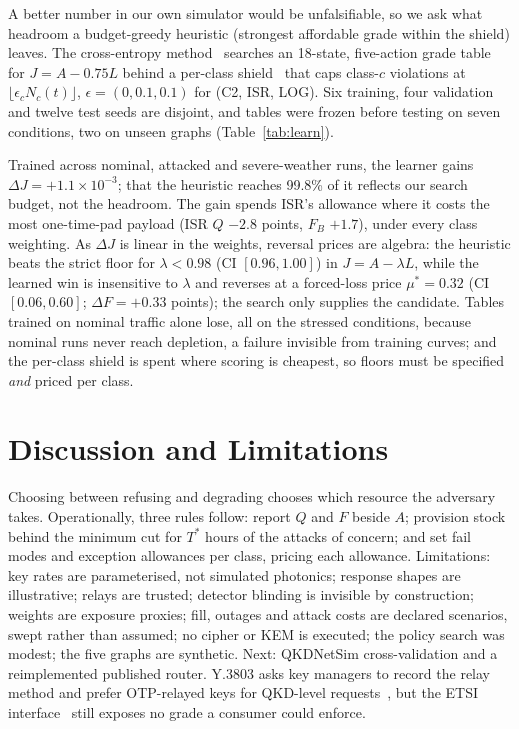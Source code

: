 \documentclass[conference,a4paper]{IEEEtran}
\begin{document}
A better number in our own simulator would be unfalsifiable, so we ask what headroom
a budget-greedy heuristic (strongest affordable grade within the shield) leaves. The
cross-entropy method~\cite{cem} searches an 18-state, five-action grade table for
$J=A-0.75L$ behind a per-class shield~\cite{shield} that caps class-$c$ violations at
$\lfloor\epsilon_cN_c(t)\rfloor$, $\epsilon=(0,0.1,0.1)$ for (C2, ISR, LOG). Six training, four validation and twelve test seeds are disjoint, and tables were frozen before testing
on seven conditions, two on unseen graphs (Table~\ref{tab:learn}).

Trained across nominal, attacked and severe-weather runs, the learner gains $\Delta J=+1.1\times10^{-3}$; that the heuristic reaches 99.8\% of it reflects our
search budget, not the headroom. The gain spends ISR's allowance where it costs the
most one-time-pad payload (ISR $Q$ $-2.8$ points, $F_B$ $+1.7$), under every class
weighting. As $\Delta J$ is linear in the weights, reversal prices are algebra: the
heuristic beats the strict floor for $\lambda<0.98$ (CI $[0.96,1.00]$) in
$J=A-\lambda L$, while the learned win is insensitive to $\lambda$ and reverses at a
forced-loss price $\mu^\ast=0.32$ (CI $[0.06,0.60]$; $\Delta F=+0.33$ points); the
search only supplies the candidate. Tables trained on nominal traffic alone lose, all
on the stressed conditions, because nominal runs never reach depletion, a failure
invisible from training curves; and the per-class shield is spent where scoring is
cheapest, so floors must be specified \emph{and} priced per class.

\section{Discussion and Limitations}
Choosing between refusing and degrading chooses which resource the adversary takes. Operationally, three rules follow: report $Q$ and $F$ beside $A$; provision stock behind the minimum cut for $T^\ast$ hours of the attacks of concern; and set fail modes and exception allowances per class, pricing each allowance. Limitations: key rates are parameterised, not simulated
photonics; response shapes are illustrative; relays are trusted; detector blinding
is invisible by construction; weights are exposure proxies; fill, outages and attack
costs are declared scenarios, swept rather than assumed; no cipher or KEM is
executed; the policy search was modest; the five graphs are synthetic. Next:
QKDNetSim cross-validation and a reimplemented published router. Y.3803 asks
key managers to record the relay method and prefer OTP-relayed keys for QKD-level
requests~\cite{itu3803}, but the ETSI interface~\cite{etsi014} still exposes no grade
a consumer could enforce.
\end{document}
